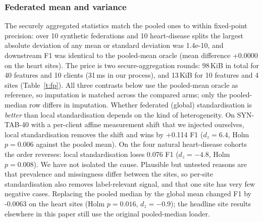 \documentclass[conference]{IEEEtran}
\begin{document}
\subsubsection{Federated mean and variance}
The securely aggregated statistics match the pooled ones to within fixed-point precision: over 10 synthetic federations and 10 heart-disease splits the largest absolute deviation of any mean or standard deviation was 1.4e-10, and downstream F1 was identical to the pooled-mean oracle (mean difference +0.0000 on the heart sites). The price is two secure-aggregation rounds: 98\,KiB in total for 40 features and 10 clients (31\,ms in our process), and 13\,KiB for 10 features and 4 sites (Table~\ref{t:fp}). All three contrasts below use the pooled-mean oracle as reference, so imputation is matched across the compared arms; only the pooled-median row differs in imputation. Whether federated (global) standardisation is \emph{better} than local standardisation depends on the kind of heterogeneity. On SYN-TAB-40 with a per-client affine measurement shift that we injected ourselves, local standardisation removes the shift and wins by +0.114 F1 ($d_z=6.4$, Holm $p=0.006$ against the pooled mean). On the four natural heart-disease cohorts the order reverses: local standardisation loses 0.076 F1 ($d_z=-4.8$, Holm $p=0.008$). We have not isolated the cause. Plausible but untested reasons are that prevalence and missingness differ between the sites, so per-site standardisation also removes label-relevant signal, and that one site has very few negative cases. Replacing the pooled median by the global mean changed F1 by -0.0063 on the heart sites (Holm $p=0.016$, $d_z=-0.9$); the headline site results elsewhere in this paper still use the original pooled-median loader.
\end{document}
